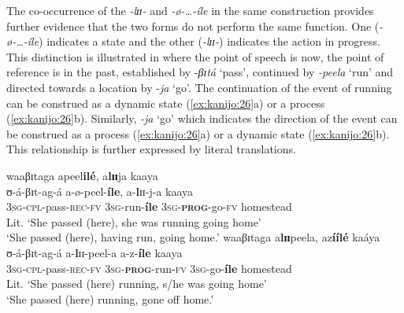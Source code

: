 \documentclass[output=paper,newtxmath,modfonts,nonflat,draftmode]{langsci/langscibook}
\begin{document}
\ea \label{ex:kanijo:25}

\z
\z

The co-occurrence of the \textit{-lɪɪ-} and \textit{-ø-…-íle} in the same construction provides further evidence that the two forms do not perform the same function. One (\textit{-ø-…-íle}) indicates a state and the other (\textit{-lɪɪ-}) indicates the action in progress. This distinction is illustrated in  where the point of speech is now, the point of reference is in the past, established by -\textit{βɪtá} ‘pass’, continued by \textit{-peela} ‘run’ and directed towards a location by -\textit{ja} ‘go’. The continuation of the event of running can be construed as a dynamic state (\ref{ex:kanijo:26}a) or a process (\ref{ex:kanijo:26}b). Similarly, \textit{-ja} ‘go’ which indicates the direction of the event can be construed as a process (\ref{ex:kanijo:26}a) or a dynamic state (\ref{ex:kanijo:26}b). This relationship is further expressed by literal translations. 

\ea \label{ex:kanijo:26}
\ea
\glll waaβɪtaga apeel\textbf{ilé}, a\textbf{l}\textbf{ɪɪ}ja kaaya \\
    ʊ-á-βɪt-ag-á                a-ø-peel-\textbf{íle}, a-\textbf{l}ɪɪ-j-a                 kaaya \\
    3\textsc{sg}-\textsc{cpl}-pass-\textsc{rec}-\textsc{fv} 3\textsc{sg}-run-\textbf{íle}  3\textsc{sg}-\textbf{\textsc{prog}}-go-\textsc{fv} homestead \\
\glt    Lit. ‘She passed (here), she was running going home’ \\
   ‘She passed (here), having run, going home.’
\ex
\glll waaβɪtaga a\textbf{l}\textbf{ɪɪ}peela, az\textbf{íílé}         kaáya\\
    ʊ-á-βɪt-ag-á                 a-\textbf{l}ɪɪ-peel-a            a-z-\textbf{íle}       kaaya\\
    3\textsc{sg}-\textsc{cpl}-pass-\textsc{rec}-\textsc{fv} 3\textsc{sg}-\textbf{\textsc{prog}}-run-\textsc{fv} 3\textsc{sg}-go-\textbf{íle} homestead\\
    \glt Lit. ‘She passed (here) running, s/he was going home’\\
    ‘She passed (here) running, gone off home.’
\z
\z
\end{document}
